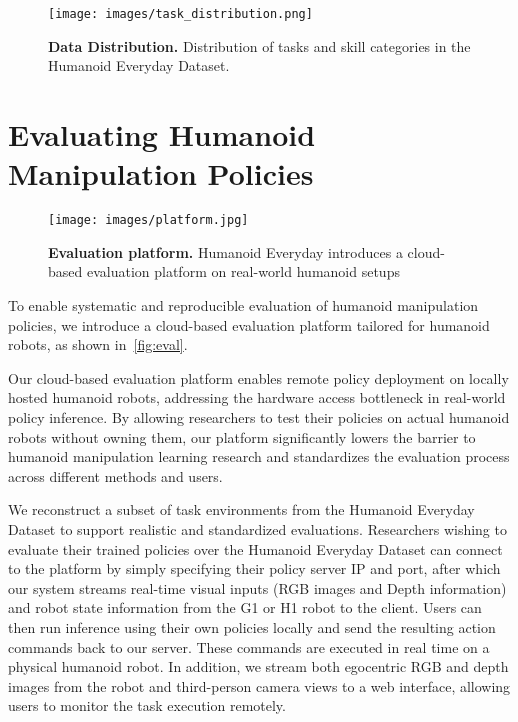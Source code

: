 \documentclass[letterpaper, 10pt, conference]{ieeeconf}
\begin{document}
\begin{figure}[H]
  \centering
  \texttt{[image: images/task\_distribution.png]}
  \caption{\textbf{Data Distribution.} Distribution of tasks and skill categories in the Humanoid Everyday Dataset.}
  \label{fig:distribution}
\end{figure}




\section{Evaluating Humanoid Manipulation Policies}
\begin{figure}[H]
  \centering
  \texttt{[image: images/platform.jpg]}
  \caption{\textbf{Evaluation platform.} Humanoid Everyday introduces a cloud-based evaluation platform on real-world humanoid setups }
  \label{fig:eval}
\end{figure}



To enable systematic and reproducible evaluation of humanoid manipulation policies, we introduce a cloud-based evaluation platform tailored for humanoid robots, as shown in~\autoref{fig:eval}.

Our cloud-based evaluation platform enables remote policy deployment on locally hosted humanoid robots, addressing the hardware access bottleneck in real-world policy inference. By allowing researchers to test their policies on actual humanoid robots without owning them, our platform significantly lowers the barrier to humanoid manipulation learning research and standardizes the evaluation process across different methods and users.\par

We reconstruct a subset of task environments from the Humanoid Everyday Dataset to support realistic and standardized evaluations. Researchers wishing to evaluate their trained policies over the Humanoid Everyday Dataset can connect to the platform by simply specifying their policy server IP and port, after which our system streams real-time visual inputs (RGB images and Depth information) and robot state information from the G1 or H1 robot to the client. Users can then run inference using their own policies locally and send the resulting action commands back to our server. These commands are executed in real time on a physical humanoid robot. In addition, we stream both egocentric RGB and depth images from the robot and third-person camera views to a web interface, allowing users to monitor the task execution remotely.\par
\end{document}
